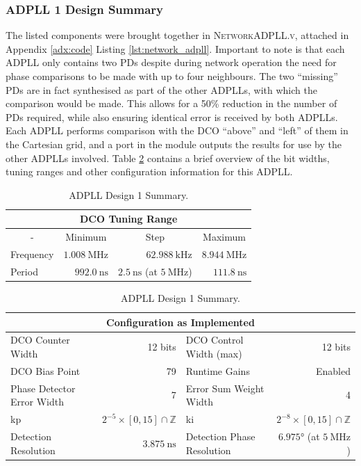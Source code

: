 \subsubsection{\acs{ADPLL} 1 Design Summary}
The listed components were brought together in \textsc{NetworkADPLL.v}, attached in Appendix \ref{adx:code} Listing \ref{lst:network_adpll}. Important to note is that each \ac{ADPLL} only contains two \acl{PD}s despite during network operation the need for phase comparisons to be made with up to four neighbours. The two ``missing'' \ac{PD}s are in fact synthesised as part of the other \ac{ADPLL}s, with which the comparison would be made. This allows for a 50\% reduction in the number of \ac{PD}s required, while also ensuring identical error is received by both \ac{ADPLL}s. Each \ac{ADPLL} performs comparison with the \ac{DCO} ``above'' and ``left'' of them in the Cartesian grid, and a port in the module outputs the results for use by the other \ac{ADPLL}s involved. %
Table \ref{table:adpll1} contains a brief overview of the bit widths, tuning ranges and other configuration information for this \ac{ADPLL}.
\begin{table}[!h]
	\begin{center}
		\begin{tabular}{|l|r|r|r|}
			\multicolumn{4}{c}{\ac{DCO} Tuning Range} \T\\
			\hline
			\multicolumn{1}{|c|}{-} & \multicolumn{1}{c|}{Minimum} & \multicolumn{1}{c|}{Step} & \multicolumn{1}{c|}{Maximum} \T\\
			\hline
			Frequency & $1.008~\si{\mega\hertz}$ & \multicolumn{1}{r|}{$62.988~\si{\kilo\hertz}$} & $8.944~\si{\mega\hertz}$ \T\\
			\hline
			Period & $992.0~\si{\nano\second}$ & \multicolumn{1}{r|}{$2.5~\si{\nano\second}$ (at $5~\si{\mega\hertz}$)} & $111.8~\si{\nano\second}$ \T\\
			\hline
		\end{tabular}
		\begin{tabular}{|l|r|l|r|}
			\multicolumn{4}{c}{Configuration as Implemented} \T\\
			\hline
			\ac{DCO} Counter Width & 12 bits & \ac{DCO} Control Width (max) & 12 bits \T\\
			\hline
			\ac{DCO} Bias Point & 79 & Runtime Gains & Enabled \T\\
			\hline
			Phase Detector Error Width & 7 & Error Sum Weight Width & 4 \T\\
			\hline
			\acs{kp} & $2^{-5}\times[0,15]\cap\mathbb{Z}$ & \acs{ki} & $2^{-8}\times[0,15]\cap\mathbb{Z}$ \T\\
			\hline
			Detection Resolution & $3.875~\si{\nano\second}$ & Detection Phase Resolution & $6.975\si{\degree}$ (at $5~\si{\mega\hertz}$)\\
			\hline
		\end{tabular}
	\end{center}
\caption[ADPLL Design 1 Summary]{ADPLL Design 1 Summary.}
\label{table:adpll1}
\end{table}

